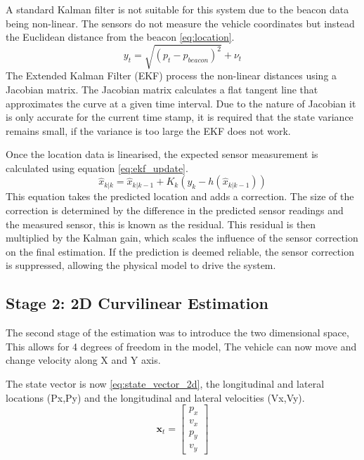 A standard Kalman filter is not suitable for this system due to the beacon data being non-linear. The sensors do not measure the vehicle coordinates but instead the Euclidean distance from the beacon \eqref{eq:location}.
\begin{equation} \label{eq:location}
    y_t = \sqrt{(p_t - p_{beacon})^2} + \nu_t
\end{equation}
The Extended Kalman Filter (EKF) process the non-linear distances using a Jacobian matrix. The Jacobian matrix calculates a flat tangent line that approximates the curve at a given time interval. Due to the nature of Jacobian it is only accurate for the current time stamp, it is required that the state variance remains small, if the variance is too large the EKF does not work.

\noindent Once the location data is linearised, the expected sensor measurement is calculated using equation \eqref{eq:ekf_update}.
\begin{equation} \label{eq:ekf_update}
    \hat{x}_{k|k} = \hat{x}_{k|k-1} + K_k \left( y_k - h(\hat{x}_{k|k-1}) \right)
\end{equation}
This equation takes the predicted location and adds a correction. The size of the correction is determined by the difference in the predicted sensor readings and the measured sensor, this is known as the residual. This residual is then multiplied by the Kalman gain, which scales the influence of the sensor correction on the final estimation. If the prediction is deemed reliable, the sensor correction is suppressed, allowing the physical model to drive the system.

\subsection{Stage 2: 2D Curvilinear Estimation}
The second stage of the estimation was to introduce the two dimensional
space, This allows for 4 degrees of freedom in the model, The vehicle can now
move and change velocity along X and Y axis.

\noindent The state vector is now \eqref{eq:state_vector_2d}, the
longitudinal and lateral locations (Px,Py) and the longitudinal and lateral velocities
(Vx,Vy).  
\begin{equation} \label{eq:state_vector_2d}
    \mathbf{x}_t = \begin{bmatrix} p_x \\ v_x \\ p_y \\ v_y \end{bmatrix}
\end{equation}


